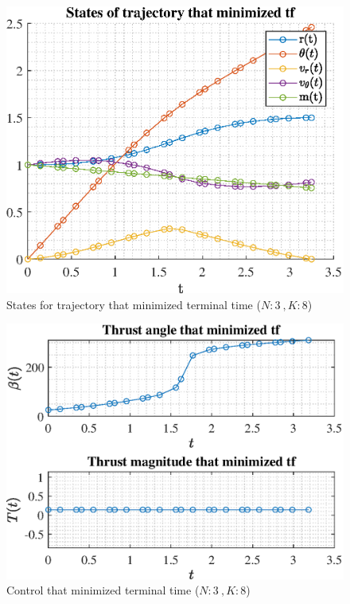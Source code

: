 \documentclass[]{article}
\begin{document}
	\begin{figure}
		\centering
		\includegraphics[scale=0.75]{states_N3_K8_C3_tf.eps}
		\caption{States for trajectory that minimized terminal time (\(N:3\ , K:8\))}
		\label{fig:states_N3_K8_C3_tf}
	\end{figure}
	\begin{figure}
		\centering
		\includegraphics[scale=0.75]{control_N3_K8_C3_tf.eps}
		\caption{Control that minimized terminal time (\(N:3\ , K:8\))}
		\label{fig:control_N3_K8_C3_tf}
	\end{figure}
\end{document}
